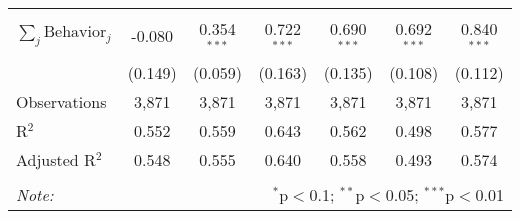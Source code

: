 \begin{tabular}{@{\extracolsep{1pt}}lcccccc}
\hline \\[-1.8ex] 
$\sum_j \mathrm{Behavior}_j$ & -0.080 & 0.354$^{***}$ & 0.722$^{***}$ & 0.690$^{***}$ & 0.692$^{***}$ & 0.840$^{***}$ \\ 
 & (0.149) & (0.059) & (0.163) & (0.135) & (0.108) & (0.112) \\ 
Observations & 3,871 & 3,871 & 3,871 & 3,871 & 3,871 & 3,871 \\ 
R$^{2}$ & 0.552 & 0.559 & 0.643 & 0.562 & 0.498 & 0.577 \\ 
Adjusted R$^{2}$ & 0.548 & 0.555 & 0.640 & 0.558 & 0.493 & 0.574 \\ 
\hline 
\hline \\[-1.8ex] 
\textit{Note:}  & \multicolumn{6}{r}{$^{*}$p$<$0.1; $^{**}$p$<$0.05; $^{***}$p$<$0.01} \\ 
\end{tabular} 